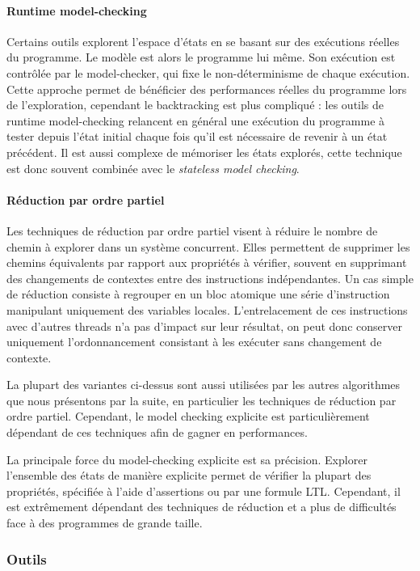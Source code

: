 \paragraph{Runtime model-checking}
Certains outils explorent l'espace d'états en se basant sur des
exécutions réelles du programme. Le modèle est alors le programme lui
même. Son exécution est contrôlée par le model-checker, qui fixe le
non-déterminisme de chaque exécution. Cette approche permet de
bénéficier des performances réelles du programme lors de l'exploration,
cependant le backtracking est plus compliqué : les outils de runtime
model-checking relancent en général une exécution du programme à tester
depuis l'état initial chaque fois qu'il est nécessaire de revenir à un
état précédent. Il est aussi complexe de mémoriser les états explorés,
cette technique est donc souvent combinée avec le \emph{stateless model
checking}.

\paragraph{Réduction par ordre partiel}
Les techniques de réduction par ordre partiel visent à réduire le nombre de
chemin à explorer dans un système concurrent. Elles permettent de supprimer les
chemins équivalents par rapport aux propriétés à vérifier, souvent en supprimant
des changements de contextes entre des instructions indépendantes. Un cas simple
de réduction consiste à regrouper en un bloc atomique une série d'instruction
manipulant uniquement des variables locales. L'entrelacement de ces instructions
avec d'autres threads n'a pas d'impact sur leur résultat, on peut donc conserver
uniquement l'ordonnancement consistant à les exécuter sans changement de
contexte.

La plupart des variantes ci-dessus sont aussi utilisées par les autres
algorithmes que nous présentons par la suite, en particulier les
techniques de réduction par ordre partiel. Cependant, le model checking
explicite est particulièrement dépendant de ces techniques afin de
gagner en performances.

La principale force du model-checking explicite est sa précision. Explorer
l'ensemble des états de manière explicite permet de vérifier la plupart des
propriétés, spécifiée à l'aide d'assertions ou par une formule LTL. Cependant,
il est extrêmement dépendant des techniques de réduction et a plus de
difficultés face à des programmes de grande taille.

\subsubsection{Outils}

